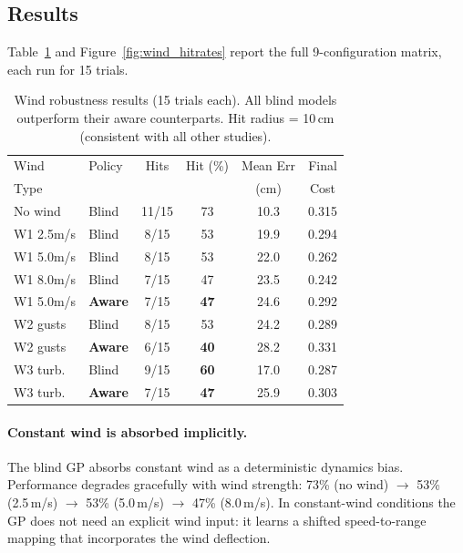 \subsection{Results}
\label{sec:study4:results}

Table~\ref{tab:wind_results} and Figure~\ref{fig:wind_hitrates} report the full
9-configuration matrix, each run for 15 trials.

\begin{table}[t]
  \centering
  \caption{Wind robustness results (15 trials each).
           All blind models outperform their aware counterparts.
           Hit radius = 10\,cm (consistent with all other studies).}
  \label{tab:wind_results}
  \small
  \begin{tabular}{llcccc}
    \toprule
    Wind & Policy & Hits & Hit (\%) & Mean Err & Final \\
    Type &        &      &          & (cm)     & Cost \\
    \midrule
    No wind   & Blind & 11/15 & 73  & 10.3 & 0.315 \\
    W1 2.5m/s & Blind &  8/15 & 53  & 19.9 & 0.294 \\
    W1 5.0m/s & Blind &  8/15 & 53  & 22.0 & 0.262 \\
    W1 8.0m/s & Blind &  7/15 & 47  & 23.5 & 0.242 \\
    W1 5.0m/s & \textbf{Aware} &  7/15 & \textbf{47} & 24.6 & 0.292 \\
    \midrule
    W2 gusts  & Blind &  8/15 & 53  & 24.2 & 0.289 \\
    W2 gusts  & \textbf{Aware} &  6/15 & \textbf{40} & 28.2 & 0.331 \\
    \midrule
    W3 turb.  & Blind &  9/15 & \textbf{60}  & 17.0 & 0.287 \\
    W3 turb.  & \textbf{Aware} &  7/15 & \textbf{47} & 25.9 & 0.303 \\
    \bottomrule
  \end{tabular}
\end{table}

\paragraph{Constant wind is absorbed implicitly.}
The blind GP absorbs constant wind as a deterministic dynamics bias.
Performance degrades gracefully with wind strength: 73\% (no wind) $\to$ 53\% (2.5\,m/s)
$\to$ 53\% (5.0\,m/s) $\to$ 47\% (8.0\,m/s).
In constant-wind conditions the GP does not need an explicit wind input: it learns a
shifted speed-to-range mapping that incorporates the wind deflection.

